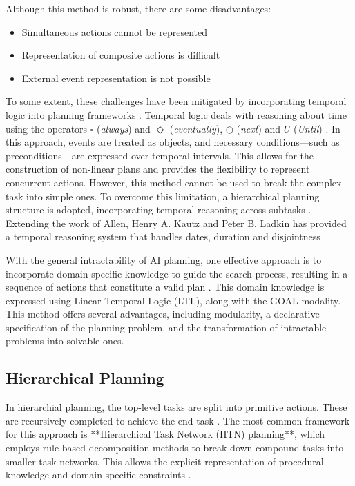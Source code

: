 \documentclass[a4paper,11pt]{lmcs}
\begin{document}
Although this method is robust, there are some disadvantages:
\begin{itemize}
 \item Simultaneous actions cannot be represented
 \item Representation of composite actions is difficult
 \item External event representation is not possible
\end{itemize}
To some extent, these challenges have been mitigated by incorporating temporal logic into planning frameworks \citep{allen}. Temporal logic deals with reasoning about time using the operators $\square$ (\textit{always}) and $\Diamond$ (\textit{eventually}), $\bigcirc$ (\textit{next}) and $U$ (\textit{Until}) \citep{huth}. In this approach, events are treated as objects, and necessary conditions—such as preconditions—are expressed over temporal intervals. This allows for the construction of non-linear plans and provides the flexibility to represent concurrent actions. However, this method cannot be used to break the complex task into simple ones. To overcome this limitation, a hierarchical planning structure is adopted, incorporating temporal reasoning across subtasks \citep{fei}.
Extending the work of Allen, Henry A. Kautz and Peter B. Ladkin has provided a temporal reasoning system that handles dates, duration and disjointness \citep{kautz}.

With the general intractability of AI planning, one effective approach is to incorporate domain-specific knowledge to guide the search process, resulting in a sequence of actions that constitute a valid plan \citep{Bacchus2000}. This domain knowledge is expressed using Linear Temporal Logic (LTL), along with the GOAL modality. This method offers several advantages, including modularity, a declarative specification of the planning problem, and the transformation of intractable problems into solvable ones.
\subsection*{Hierarchical Planning}
In hierarchial planning, the top-level tasks are split into primitive actions. These are recursively completed to achieve the end task \cite{hplan2}. The most common framework for this approach is **Hierarchical Task Network (HTN) planning**, which employs rule-based decomposition methods to break down compound tasks into smaller task networks. This allows the explicit representation of procedural knowledge and domain-specific constraints \cite{htn1}.
\end{document}
